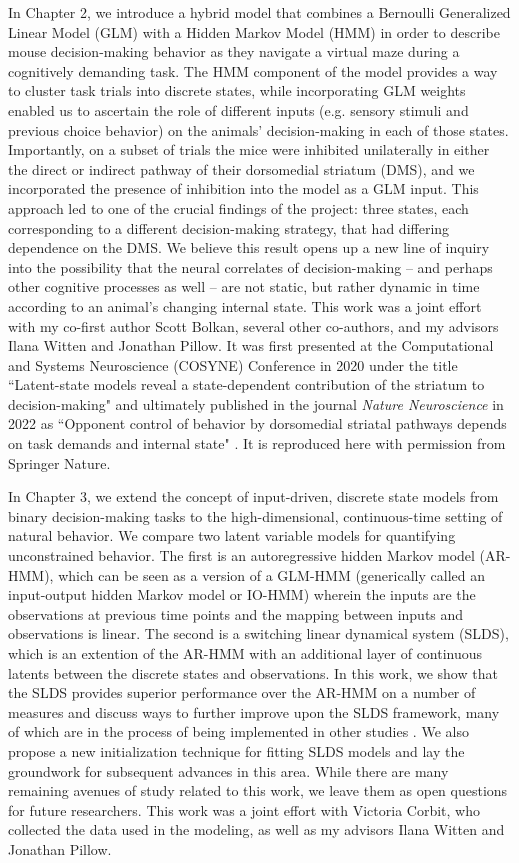 In Chapter 2, we introduce a hybrid model that combines a Bernoulli Generalized Linear Model (GLM) with a Hidden Markov Model (HMM) in order to describe mouse decision-making behavior as they navigate a virtual maze during a cognitively demanding task. The HMM component of the model provides a way to cluster task trials into discrete states, while incorporating GLM weights enabled us to ascertain the role of different inputs (e.g. sensory stimuli and previous choice behavior) on the animals' decision-making in each of those states. Importantly, on a subset of trials the mice were inhibited unilaterally in either the direct or indirect pathway of their dorsomedial striatum (DMS), and we incorporated the presence of inhibition into the model as a GLM input. This approach led to one of the crucial findings of the project: three states, each corresponding to a different decision-making strategy, that had differing dependence on the DMS. We believe this result opens up a new line of inquiry into the possibility that the neural correlates of decision-making -- and perhaps other cognitive processes as well -- are not static, but rather dynamic in time according to an animal's changing internal state. This work was a joint effort with my co-first author Scott Bolkan, several other co-authors, and my advisors Ilana Witten and Jonathan Pillow. It was first presented at the Computational and Systems Neuroscience (COSYNE) Conference in 2020 under the title ``Latent-state models reveal a state-dependent contribution of the striatum to decision-making" and ultimately published in the journal \textit{Nature Neuroscience} in 2022 as ``Opponent control of behavior by dorsomedial striatal pathways depends on task demands and internal state" \cite{bolkan_opponent_2022}. It is reproduced here with permission from Springer Nature. 

In Chapter 3, we extend the concept of input-driven, discrete state models from binary decision-making tasks to the high-dimensional, continuous-time setting of natural behavior. We compare two latent variable models for quantifying unconstrained behavior. The first is an autoregressive hidden Markov model (AR-HMM), which can be seen as a version of a GLM-HMM (generically called an input-output hidden Markov model or IO-HMM) wherein the inputs are the observations at previous time points and the mapping between inputs and observations is linear. The second is a switching linear dynamical system (SLDS), which is an extention of the AR-HMM with an additional layer of continuous latents between the discrete states and observations. In this work, we show that the SLDS provides superior performance over the AR-HMM on a number of measures and discuss ways to further improve upon the SLDS framework, many of which are in the process of being implemented in other studies \cite{weinreb_keypoint-moseq_2023}. We also propose a new initialization technique for fitting SLDS models and lay the groundwork for subsequent advances in this area. While there are many remaining avenues of study related to this work, we leave them as open questions for future researchers. This work was a joint effort with Victoria Corbit, who collected the data used in the modeling, as well as my advisors Ilana Witten and Jonathan Pillow. 

